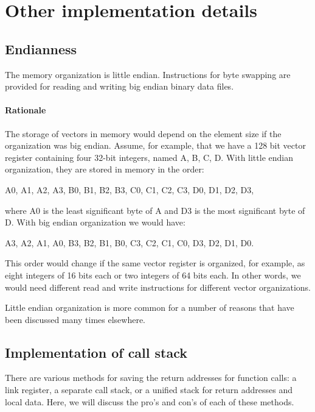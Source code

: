 \documentclass[forwardcom.tex]{subfiles}
\begin{document}
\RaggedRight


\chapter{Other implementation details}
\section{Endianness} \label{endianness}
The memory organization is little endian. Instructions for byte swapping are provided for reading and writing big endian binary data files.

\subsubsection{Rationale}
The storage of vectors in memory would depend on the element size if the organization was big endian. Assume, for example, that we have a 128 bit vector register containing four 32-bit integers, named A, B, C, D. With little endian organization, they are stored in memory in the order:
\vspace{2mm}

A0, A1, A2, A3, B0, B1, B2, B3, C0, C1, C2, C3, D0, D1, D2, D3,
\vspace{2mm}

where A0 is the least significant byte of A and D3 is the most significant byte of D. With big endian organization we would have:
\vspace{2mm}

A3, A2, A1, A0, B3, B2, B1, B0, C3, C2, C1, C0, D3, D2, D1, D0.
\vspace{2mm}

This order would change if the same vector register is organized, for example, as eight integers of 16 bits each or two integers of 64 bits each. In other words, we would need different read and write instructions for different vector organizations. 
\vspace{2mm}

Little endian organization is more common for a number of reasons that have been discussed many times elsewhere.
\vspace{2mm}

\section{Implementation of call stack} \label{callStackAlternatives}
There are various methods for saving the return addresses for function calls: a link register, a separate call stack, or a unified stack for return addresses and local data. Here, we will discuss the pro's and con's of each of these methods.
\vspace{2mm}
\end{document}
